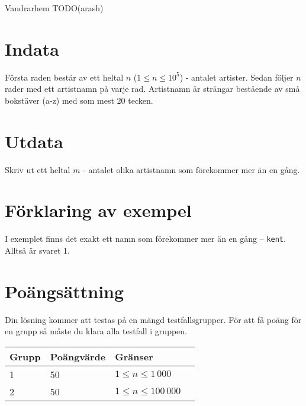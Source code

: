 
Vandrarhem TODO(arash)

\section*{Indata}

Första raden består av ett heltal $n$ ($1 \leq n \leq 10^5$) - antalet artister. Sedan följer $n$ rader med ett artistnamn på varje rad. Artistnamn är strängar bestående av små bokstäver (a-z) med som mest 20 tecken.

\section*{Utdata}

Skriv ut ett heltal $m$ - antalet olika artistnamn som förekommer mer än en gång.

\section*{Förklaring av exempel}

I exemplet finns det exakt ett namn som förekommer mer än en gång -- \texttt{kent}. Alltså är svaret 1.

\section*{Poängsättning}

Din lösning kommer att testas på en mängd testfallsgrupper. För att få poäng för en grupp
så måste du klara alla testfall i gruppen.

\begin{tabular}{| l | l | l | l |}
\hline
Grupp & Poängvärde & Gränser \\ \hline
1     & 50         & $ 1 \le n \le 1\,000$ \\ \hline
2     & 50         & $ 1 \le n \le 100\,000$ \\ \hline
\end{tabular}
